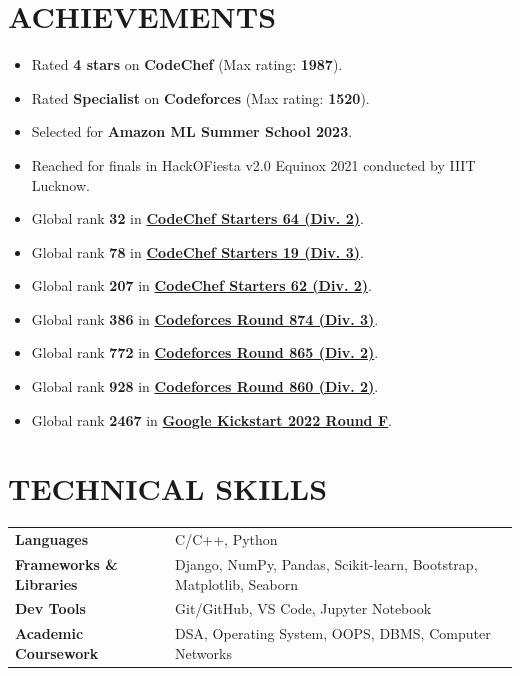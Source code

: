 \documentclass[12pt]{article}
\begin{document}
\section*{ACHIEVEMENTS}
\begin{itemize}[leftmargin=15px, topsep=1pt, itemsep=1pt, partopsep=2pt, parsep=2pt]
    \item Rated \textbf{4 stars} on \textbf{CodeChef} (Max rating: \textbf{1987}).
    \item Rated \textbf{Specialist} on \textbf{Codeforces} (Max rating: \textbf{1520}).
    \item Selected for \textbf{Amazon ML Summer School 2023}.
    \item Reached for finals in HackOFiesta v2.0 Equinox 2021 conducted by IIIT Lucknow.
    \item Global rank \textbf{32} in \href{https://www.codechef.com/rankings/START64B?search=tanishka125}{\textbf{CodeChef Starters 64 (Div. 2)}}.
    \item Global rank \textbf{78} in \href{https://www.codechef.com/rankings/START19C?search=tanishka125}{\textbf{CodeChef Starters 19 (Div. 3)}}.
    \item Global rank \textbf{207} in \href{https://www.codechef.com/rankings/START62B?search=tanishka125}{\textbf{CodeChef Starters 62 (Div. 2)}}.
    \item Global rank \textbf{386} in \href{https://codeforces.com/contest/1833/standings/participant/155663820#p155663820}{\textbf{Codeforces Round 874 (Div. 3)}}.
    \item Global rank \textbf{772} in \href{https://codeforces.com/contest/1816/standings/participant/153504271#p153504271}{\textbf{Codeforces Round 865 (Div. 2)}}.
    \item Global rank \textbf{928} in \href{https://codeforces.com/contest/1798/standings/participant/152498821#p152498821}{\textbf{Codeforces Round 860 (Div. 2)}}.
    \item Global rank \textbf{2467} in \href{https://codingcompetitions.withgoogle.com/kickstart/submissions/00000000008cb409/0000000000648019}{\textbf{Google Kickstart 2022 Round F}}.

\end{itemize}

\section*{TECHNICAL SKILLS}
\vspace{-2pt}
\begin{tabularx}{\textwidth}{@{}ll}
    \textbf{Languages}               & C/C++, Python                                                       \\
    \textbf{Frameworks \& Libraries} & Django, NumPy, Pandas, Scikit-learn, Bootstrap, Matplotlib, Seaborn \\
    \textbf{Dev Tools}               & Git/GitHub, VS Code, Jupyter Notebook                               \\
    \textbf{Academic Coursework}     & DSA, Operating System, OOPS, DBMS, Computer Networks                \\
\end{tabularx}
\end{document}
